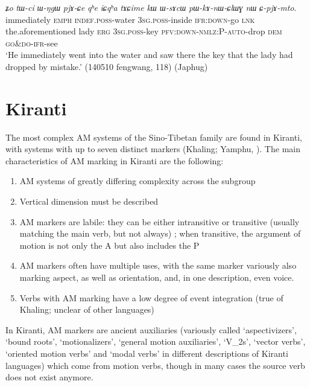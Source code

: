 \documentclass[oneside,a4paper,11pt]{article}
\newcommand{\ipa}[1]{{\phon\textit{#1}}}
\newcommand{\rouge}[1]{{\color{red}#1}}
\begin{document}
\begin{exe}
\ex  \label{ex:CpjAmto}
\gll  \ipa{nɯɕɯmɯma}	\ipa{ʑo}	\ipa{tɯ-ci}	\ipa{ɯ-ŋgɯ}	\ipa{pjɤ-ɕe}	\ipa{qʰe}	\ipa{iɕqʰa}	\ipa{tɤɕime}	\ipa{kɯ}	\ipa{ɯ-sɤcɯ}	\ipa{pɯ-kɤ-nɯ-ɕlɯɣ}	\ipa{nɯ}	\ipa{\rouge{ɕ}-pjɤ-mto}. \\
immediately \textsc{emph} \textsc{indef}.\textsc{poss}-water \textsc{3sg}.\textsc{poss}-inside \textsc{ifr}:\textsc{down}-go \textsc{lnk} the.aforementioned lady \textsc{erg} \textsc{3sg}.\textsc{poss}-key \textsc{pfv}:\textsc{down}-\textsc{nmlz}:P-\textsc{auto}-drop \textsc{dem} \rouge{\textsc{go\&do}}-\textsc{ifr}-see \\
\glt `He immediately went into the water and saw there the key that the lady had dropped by mistake.' (140510 fengwang, 118) (Japhug)
\end{exe}

\section{Kiranti}  
The most complex AM systems of the Sino-Tibetan family are found in Kiranti, with systems with up to seven distinct markers (Khaling; Yamphu, \citealt[137-194]{rutgers98yamphu}).
The main characteristics of AM marking in Kiranti are the following:

\begin{enumerate}
\item AM systems of greatly differing complexity across the subgroup
\item Vertical dimension must be described
\item AM markers are labile: they can be either intransitive or transitive (usually matching the main verb, but not always) ; when transitive, the argument of motion is not only the A but also includes the P
\item AM markers often have multiple uses, with the same marker variously also marking aspect, as well as orientation, and, in one description, even voice.
\item Verbs with AM marking have a low degree of event integration (true of Khaling; unclear of other languages)
\end{enumerate}


In Kiranti, AM markers are ancient auxiliaries (variously called `aspectivizers', `bound roots', `motionalizers',   `general motion auxiliaries', `V_2s', `vector verbs', `oriented motion verbs' and `modal verbs' in different descriptions of Kiranti languages) which come from motion verbs, though in many cases the source verb does not exist anymore. 
 
\end{document}
